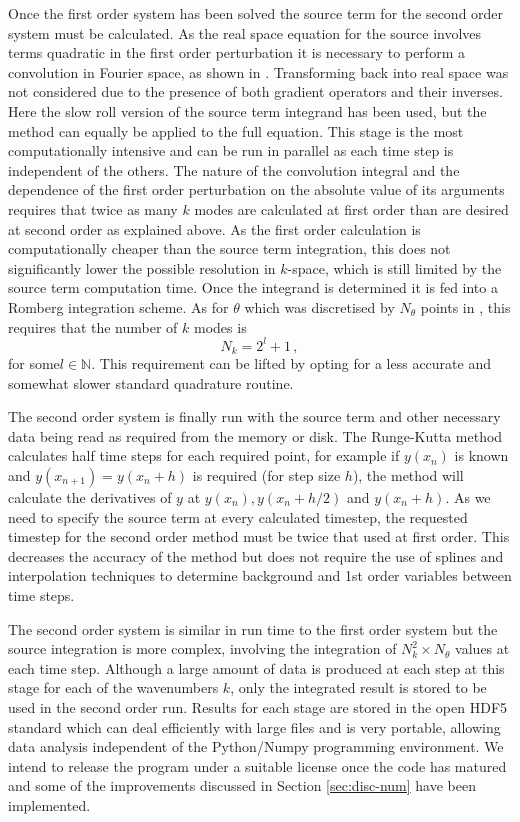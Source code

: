 Once the first order system has been solved 
the source term for the second order system must be calculated. As the
real space equation for the source involves terms quadratic in the
first order perturbation it is necessary to perform a convolution in
Fourier space, as shown in .  Transforming
back into real space was not considered due to the presence of both
gradient operators and their inverses. Here the slow roll version of
the source term integrand has been used, but the method can equally be
applied to the full equation. This stage is the most computationally
intensive and can be run in parallel as each time step is independent
of the others. The nature of the convolution integral and the
dependence of the first order perturbation on the absolute value of
its arguments requires that twice as many $k$ modes are calculated at
first order than are desired at second order as explained above.  As
the first order calculation is computationally cheaper than the source
term integration, this does not significantly lower the possible
resolution in $k$-space, which is still limited by the source term
computation time.  Once the integrand is determined it is fed into a
Romberg integration scheme. As for $\theta$  which was
discretised by $N_\theta$ points in , this requires that the
number of $k$ modes is
%
\begin{equation}
\label{eq:nk-constraint-num}
N_k=2^l + 1\,,
\end{equation}
%
for some\footnotemark $l\in\mathbb{N}$. 
This requirement can be lifted by opting for a less
accurate and somewhat slower standard quadrature routine.


The second order system is finally run with the source term and other
necessary data being read as required from the memory or disk. The
Runge-Kutta method calculates half time steps for each required point,
for example if $y(x_n)$ is known and $y(x_{n+1})=y(x_n+h)$ is required
(for step size $h$), the method will calculate the derivatives of $y$
at $y(x_n), y(x_n +h/2)$ and $y(x_n + h)$. As we need to specify the
source term at every calculated timestep, the requested timestep for
the second order method must be twice that used at first order.  This decreases the
accuracy of the method but does not require the use
of splines and interpolation techniques to determine background and
1st order variables between time steps.


The second order system is similar in run time to the first order 
system but the
source integration is more complex, involving the
integration of $N_k^2\times N_\theta$ values at
each time step.
Although a large amount of data is produced at each step at this
stage for 
each of the wavenumbers $k$, only the integrated result is stored to be used
in the second order run.
Results for each stage are stored in the open HDF5 standard which can deal
efficiently with large
files and is very portable, allowing data analysis independent of the
Python/Numpy programming environment.
We intend to release the program under a suitable license once the code has
matured and some of the improvements discussed in Section \ref{sec:disc-num} have
been implemented.


